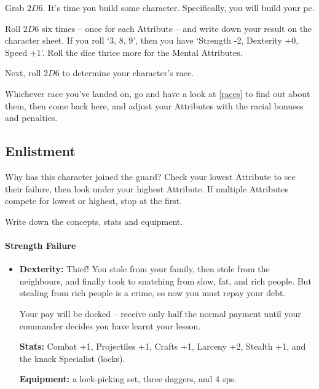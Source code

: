 \begin{multicols}{2}

\noindent
Grab $2D6$.
It's time you build some character.
Specifically, you will build your \gls{pc}.

\attributeChart

\noindent
Roll $2D6$ six times -- once for each Attribute -- and write down your result on the character sheet.
If you roll `3, 8, 9', then you have `Strength -2, Dexterity +0, Speed +1'.
Roll the dice thrice more for the Mental Attributes.

Next, roll $2D6$ to determine your character's race.

Whichever race you've landed on, go and have a look at \autoref{races} to find out about them, then come back here, and adjust your Attributes with the racial bonuses and penalties.



\subsection{Enlistment}

\label{enlistment}

Why has this character joined the \gls{guard}?
Check your lowest Attribute to see their failure, then look under your highest Attribute.
If multiple Attributes compete for lowest or highest, stop at the first.

Write down the concepts, stats and equipment.

\paragraph{Strength Failure}

\begin{itemize}

  \item
  \textbf{Dexterity:}
  Thief!
  You stole from your family, then stole from the neighbours, and finally took to snatching from slow, fat, and rich people.
  But stealing from rich people is a crime, so now you must repay your debt.

  Your pay will be docked -- receive only half the normal payment until your commander decides you have learnt your lesson.

  \textbf{Stats:}
  Combat +1, Projectiles +1, Crafts +1, Larceny +2, Stealth +1, and the knack Specialist (locks).

  \textbf{Equipment:}
  a lock-picking set, three daggers, and 4 \glspl{sp}.


\end{itemize}
\end{multicols}
